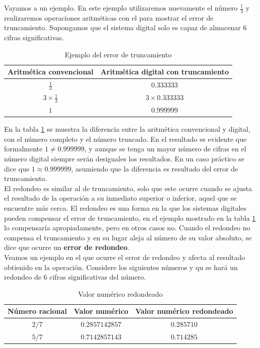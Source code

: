 Vayamos a un ejemplo. En este ejemplo utilizaremos nuevamente el número $\frac{1}{3}$ y realizaremos operaciones aritméticas con el para mostrar el 
error de truncamiento. Supongamos que el sistema digital solo es capaz de almacenar 6 cifras significativas.

\begin{table}
	\centering
	\begin{tabular}{c|c}
	\textbf{Aritmética convencional} & \textbf{Aritmética digital con truncamiento}\\
	\hline
	$\frac{1}{3}$ & $0.333333$\\
	$3\times\frac{1}{3}$ & $3\times 0.333333$\\
	$1$ & $0.999999$		
	\end{tabular}
	\caption{Ejemplo del error de truncamiento}
	\label{table:errorTruncamiento}
\end{table}

En la tabla \ref{table:errorTruncamiento} se muestra la diferencia entre la aritmética convencional y digital, con el número completo y el número truncado. 
En el resultado es evidente que  formalmente $1\not= 0.999999$, y aunque se tenga un mayor número de cifras en el número digital siempre serán desiguales 
los resultados. En un caso práctico se dice que $1\approx 0.999999$, asumiendo que la diferencia es resultado del error de truncamiento.\\

El redondeo es similar al de truncamiento, solo que este ocurre cuando se ajusta el resultado de la operación a su inmediato superior o inferior, aquel que se
encuentre más cerca. El redondeo es una forma en la que los sistemas digitales pueden compensar el error de truncamiento, en el ejemplo mostrado en la tabla 
\ref{table:errorTruncamiento} lo compensaría apropiadamente, pero en otros casos no. Cuando el redondeo no compensa el truncamiento y en su lugar aleja al 
número de su valor absoluto, se dice que ocurre un \textbf{error de redondeo}. \\

Veamos un ejemplo en el que ocurre el error de redondeo y afecta al resultado obtienido en la operación. Considere los siguientes números y qu se hará
un redondeo de 6 cifras significativas del número.

\begin{table}[ht]
	\centering
	\begin{tabular}{c|c|c}
	\textbf{Número racional} & \textbf{Valor numérico} & \textbf{Valor numérico redondeado}\\
	\hline
	$2/7$ & $0.2857142857$ & $0.285710$\\
	$5/7$ & $0.7142857143$ & $0.714285$	
	\end{tabular}
	\caption{Valor numérico redondeado}
	\label{table:errorRedondeo}
\end{table}

